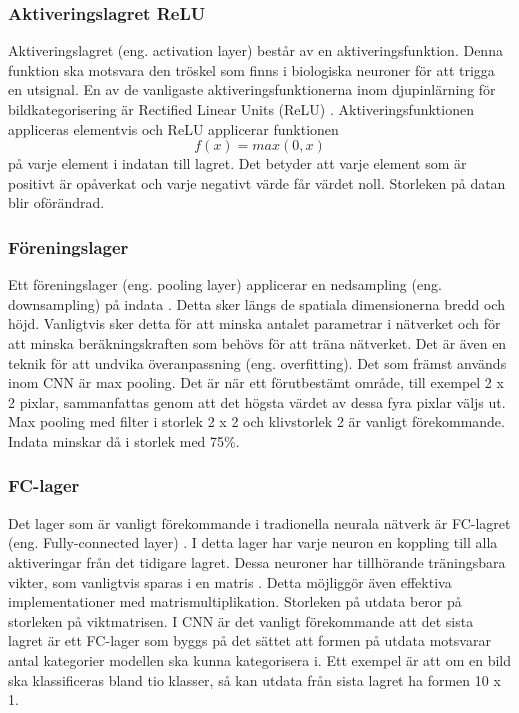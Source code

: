 \documentclass[]{kththesis}
\begin{document}
\subsubsection{Aktiveringslagret ReLU}
Aktiveringslagret (eng. activation layer) består av en aktiveringsfunktion. Denna funktion ska motsvara den tröskel som finns i biologiska neuroner för att trigga en utsignal. En av de vanligaste aktiveringsfunktionerna inom djupinlärning för bildkategorisering är Rectified Linear Units (ReLU) \parencite{krizhevsky2012imagenet}. Aktiveringsfunktionen appliceras elementvis och ReLU applicerar funktionen \begin{equation} f(x) = max(0,x) \end{equation} på varje element i indatan till lagret. Det betyder att varje element som är positivt är opåverkat och varje negativt värde får värdet noll. Storleken på datan blir oförändrad.

\subsubsection{Föreningslager}
Ett föreningslager (eng. pooling layer) applicerar en nedsampling (eng. downsampling) på indata \parencite{krizhevsky2012imagenet}. Detta sker längs de spatiala dimensionerna bredd och höjd. Vanligtvis sker detta för att minska antalet parametrar i nätverket och för att minska beräkningskraften som behövs för att träna nätverket. Det är även en teknik för att undvika överanpassning (eng. overfitting). Det som främst används inom CNN är max pooling. Det är när ett förutbestämt område, till exempel 2 x 2 pixlar, sammanfattas genom att det högsta värdet av dessa fyra pixlar väljs ut. Max pooling med filter i storlek 2 x 2 och klivstorlek 2 är vanligt förekommande. Indata minskar då i storlek med 75\%.

\subsubsection{FC-lager}
Det lager som är vanligt förekommande i tradionella neurala nätverk är FC-lagret (eng. Fully-connected layer) \parencite{krizhevsky2012imagenet}. I detta lager har varje neuron en koppling till alla aktiveringar från det tidigare lagret. Dessa neuroner har tillhörande träningsbara vikter, som vanligtvis sparas i en matris \parencite{Goodfellow-et-al-2016}. Detta möjliggör även effektiva implementationer med matrismultiplikation. Storleken på utdata beror på storleken på viktmatrisen. I CNN är det vanligt förekommande att det sista lagret är ett FC-lager som byggs på det sättet att formen på utdata motsvarar antal kategorier modellen ska kunna kategorisera i. Ett exempel är att om en bild ska klassificeras bland tio klasser, så kan utdata från sista lagret ha formen 10 x 1.
\end{document}
